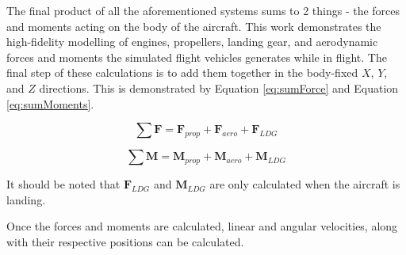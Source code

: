 \documentclass[../chapter_2.tex]{subfiles}
\begin{document}
The final product of all the aforementioned systems sums to 2 things - the forces and moments acting on the body of the aircraft. This work demonstrates the high-fidelity modelling of engines, propellers, landing gear, and aerodynamic forces and moments the simulated flight vehicles generates while in flight. The final step of these calculations is to add them together in the body-fixed $X$, $Y$, and $Z$ directions. This is demonstrated by Equation \ref{eq:sumForce} and Equation \ref{eq:sumMoments}.

\begin{equation}
    \sum \mathbf{F} = \mathbf{F}_{prop} + \mathbf{F}_{aero} + \mathbf{F}_{LDG}
    \label{eq:sumForce}
\end{equation}

\begin{equation}
    \sum \mathbf{M} = \mathbf{M}_{prop} + \mathbf{M}_{aero} + \mathbf{M}_{LDG}
    \label{eq:sumMoments}
\end{equation}

It should be noted that $\mathbf{F}_{LDG}$ and $\mathbf{M}_{LDG}$ are only calculated when the aircraft is landing.

Once the forces and moments are calculated, linear and angular velocities, along with their respective positions can be calculated.
\end{document}
